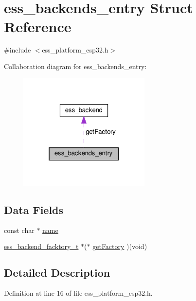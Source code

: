 \hypertarget{structess__backends__entry}{}\section{ess\+\_\+backends\+\_\+entry Struct Reference}
\label{structess__backends__entry}


{\ttfamily \#include $<$ess\+\_\+platform\+\_\+esp32.\+h$>$}



Collaboration diagram for ess\+\_\+backends\+\_\+entry\+:\nopagebreak
\begin{figure}[H]
\begin{center}
\leavevmode
\includegraphics[width=187pt]{de/d57/structess__backends__entry__coll__graph}
\end{center}
\end{figure}
\subsection*{Data Fields}
\begin{DoxyCompactItemize}
\item 
const char $\ast$ \hyperlink{structess__backends__entry_a8f8f80d37794cde9472343e4487ba3eb}{name}
\item 
\hyperlink{ess__backend_8h_ab1487f8c501b38b66796d0fbecb7ed7b}{ess\+\_\+backend\+\_\+facktory\+\_\+t} $\ast$($\ast$ \hyperlink{structess__backends__entry_a86f760dbdba11d491bc8209327d7e514}{get\+Factory} )(void)
\end{DoxyCompactItemize}


\subsection{Detailed Description}


Definition at line 16 of file ess\+\_\+platform\+\_\+esp32.\+h.



